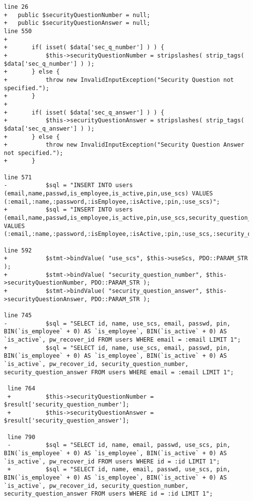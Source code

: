 \begin{lstlisting}[caption = c\_user.php]
line 26
+	public $securityQuestionNumber = null;
+	public $securityQuestionAnswer = null;
line 550
+		
+		if( isset( $data['sec_q_number'] ) ) {
+			$this->securityQuestionNumber = stripslashes( strip_tags( $data['sec_q_number'] ) );
+		} else {
+			throw new InvalidInputException("Security Question not specified.");
+		}
+		
+		if( isset( $data['sec_q_answer'] ) ) {
+			$this->securityQuestionAnswer = stripslashes( strip_tags( $data['sec_q_answer'] ) );
+		} else {
+			throw new InvalidInputException("Security Question Answer not specified.");
+		}

line 571
-			$sql = "INSERT INTO users (email,name,passwd,is_employee,is_active,pin,use_scs) VALUES (:email,:name,:password,:isEmployee,:isActive,:pin,:use_scs)";
+			$sql = "INSERT INTO users (email,name,passwd,is_employee,is_active,pin,use_scs,security_question_number,security_question_answer) VALUES (:email,:name,:password,:isEmployee,:isActive,:pin,:use_scs,:security_question_number,:security_question_answer)";

line 592
+			$stmt->bindValue( "use_scs", $this->useScs, PDO::PARAM_STR );
+			$stmt->bindValue( "security_question_number", $this->securityQuestionNumber, PDO::PARAM_STR );
+			$stmt->bindValue( "security_question_answer", $this->securityQuestionAnswer, PDO::PARAM_STR );

line 745
-			$sql = "SELECT id, name, use_scs, email, passwd, pin, BIN(`is_employee` + 0) AS `is_employee`, BIN(`is_active` + 0) AS `is_active`, pw_recover_id FROM users WHERE email = :email LIMIT 1";
+			$sql = "SELECT id, name, use_scs, email, passwd, pin, BIN(`is_employee` + 0) AS `is_employee`, BIN(`is_active` + 0) AS `is_active`, pw_recover_id, security_question_number, security_question_answer FROM users WHERE email = :email LIMIT 1";
 
 line 764
 +			$this->securityQuestionNumber = $result['security_question_number'];
 +			$this->securityQuestionAnswer = $result['security_question_answer'];
 
 line 790
 -			$sql = "SELECT id, name, email, passwd, use_scs, pin, BIN(`is_employee` + 0) AS `is_employee`, BIN(`is_active` + 0) AS `is_active`, pw_recover_id FROM users WHERE id = :id LIMIT 1";
 +			$sql = "SELECT id, name, email, passwd, use_scs, pin, BIN(`is_employee` + 0) AS `is_employee`, BIN(`is_active` + 0) AS `is_active`, pw_recover_id, security_question_number, security_question_answer FROM users WHERE id = :id LIMIT 1";
  	

\end{lstlisting}

